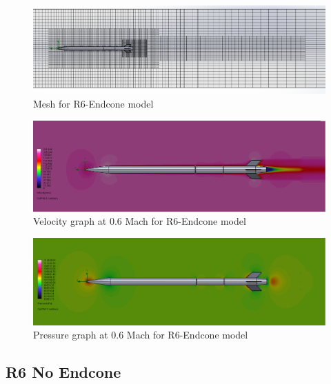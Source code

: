 \documentclass{article}
\begin{document}
\begin{figure}[H]
    \centering
    \includegraphics[width=\textwidth]{../data/R6-Endcone-Solid/mesh.png}
    \caption{Mesh for R6-Endcone model}
\end{figure}
\begin{figure}[H]
    \centering
    \includegraphics[width=\textwidth]{../data/R6-Endcone-Solid/speed.png}
    \caption{Velocity graph at 0.6 Mach for R6-Endcone model}
\end{figure}

\begin{figure}[H]
    \centering
    \includegraphics[width=\textwidth]{../data/R6-Endcone-Solid/pressure.png}
    \caption{Pressure graph at 0.6 Mach for R6-Endcone model}
\end{figure}

\subsection{R6 No Endcone}
\end{document}
